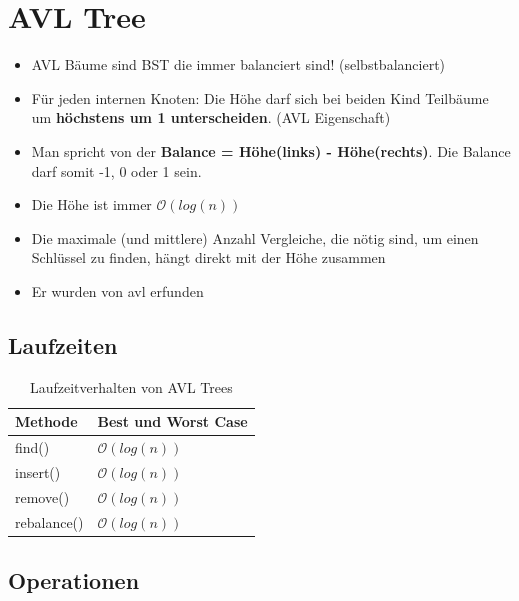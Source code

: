 \section{AVL Tree}
\begin{itemize}
	\item AVL Bäume sind BST die immer balanciert sind! (selbstbalanciert)
	\item Für jeden internen Knoten: Die Höhe darf sich bei beiden Kind Teilbäume um \textbf{höchstens um 1 unterscheiden}. (AVL Eigenschaft)
	\item Man spricht von der \textbf{Balance = Höhe(links) - Höhe(rechts)}. Die Balance darf somit -1, 0 oder 1 sein.
	\item Die Höhe ist immer $\mathcal{O}(log(n))$
	\item Die maximale (und mittlere) Anzahl Vergleiche, die nötig sind, um einen Schlüssel zu finden, hängt direkt mit der Höhe zusammen
	\item Er wurden von \gls{avl} erfunden
\end{itemize}

\subsection{Laufzeiten}
\begin{table}[h]
	\centering
	\begin{tabu} to \linewidth {l l}
		\toprule
		Methode & Best und Worst Case \\
		\midrule
		find() & $\mathcal{O}(log(n))$   \\
		insert() & $\mathcal{O}(log(n))$ \\
		remove() & $\mathcal{O}(log(n))$ \\
		rebalance() & $\mathcal{O}(log(n))$   \\
		\bottomrule
	\end{tabu}
	\caption{Laufzeitverhalten von AVL Trees}
\end{table}

\clearpage

\subsection{Operationen}
